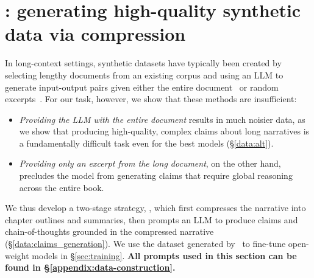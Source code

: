 \section{\pipeline: generating high-quality synthetic data via compression}
In long-context settings, synthetic datasets have typically been created by selecting lengthy documents from an existing corpus and using an LLM to generate input-output pairs given either the entire document~\cite{bai_longalign_2024} or random excerpts~\cite{dubey2024llama, yang_qwen25-1m_2025}.
For our task, however, we show that these methods are insufficient:
\begin{itemize}
    \item \textit{Providing the LLM with the entire document}  results in much noisier data, as we show that producing high-quality, complex claims about long narratives is a fundamentally difficult task even for the best models (\S\ref{data:alt}).
    \item \textit{Providing only an excerpt from the long document}, on the other hand, precludes the model from generating claims that require global reasoning across the entire book.
\end{itemize}
We thus develop a two-stage strategy, \pipeline, which first compresses the narrative into chapter outlines and summaries, then prompts an LLM to produce claims and chain-of-thoughts grounded in the compressed narrative (\S\ref{data:claims_generation}).
We use the dataset generated by \pipeline\ to fine-tune open-weight models in \S\ref{sec:training}. \textbf{All prompts used in this section can be found in \S\ref{appendix:data-construction}.}


